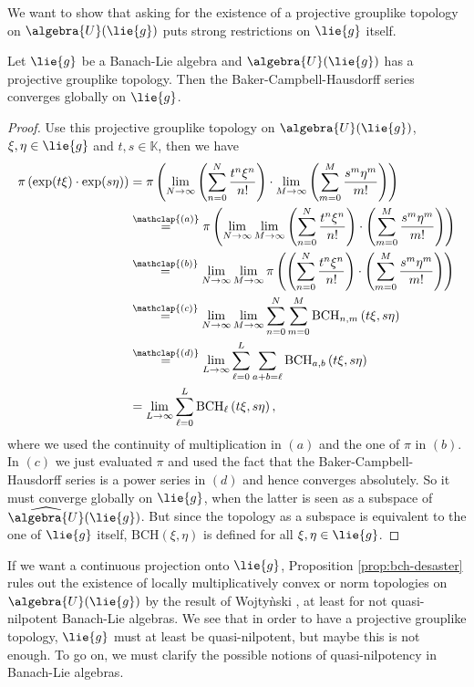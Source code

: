 \documentclass[
11pt,                          %
english                        %
]{article}
\newcommand{\bch}[2]{\mathrm{BCH}\left(#1, #2\right)}
\newcommand{\bchpart}[3]{\mathrm{BCH}_{#1}\left(#2, #3\right)}
\newcommand{\bchparts}[4]{\mathrm{BCH}_{#1, #2}\left(#3, #4\right)}
\newcommand\ot[2]{\stackrel{\mathclap{#1}}{#2}}
\begin{document}
We want to show that asking for the existence of a projective grouplike topology 
on $\algebra{U}(\lie{g})$ puts strong restrictions on $\lie{g}$ itself.
\begin{proposition}
	\label{prop:bch-desaster}
	Let $\lie{g}$ be a Banach-Lie algebra and $\algebra{U}(\lie{g})$ has a projective 
	grouplike topology. Then the Baker-Campbell-Hausdorff series converges globally 
	on $\lie{g}$.
\end{proposition}
\begin{proof}
	Use this projective grouplike topology on $\algebra{U}(\lie{g})$, $\xi, \eta \in 
	\lie{g}$ and $t,s \in \mathbb{K}$, then we have
	\begin{align*}
		\pi \left( \exp(t \xi) \cdot \exp(s \eta) \right)
		& =
		\pi
		\left(
			\lim_{N \rightarrow \infty}
			\left(
				\sum\limits_{n=0}^N
				\frac{t^n \xi^n}{n!}
			\right)
			\cdot
			\lim_{M \rightarrow \infty}
			\left(
				\sum\limits_{m=0}^M
				\frac{s^m \eta^m}{m!}
			\right)
		\right)
		\\
		& \ot{(a)}{=}
		\pi
		\left(
			\lim_{N \rightarrow \infty}
			\lim_{M \rightarrow \infty}
			\left(
				\sum\limits_{n=0}^N
				\frac{t^n \xi^n}{n!}
			\right)
			\cdot
			\left(
				\sum\limits_{m=0}^M
				\frac{s^m \eta^m}{m!}
			\right)
		\right)
		\\
		& \ot{(b)}{=}
		\lim_{N \rightarrow \infty}
		\lim_{M \rightarrow \infty}
		\pi
		\left(	
			\left(
				\sum\limits_{n=0}^N
				\frac{t^n \xi^n}{n!}
			\right)
			\cdot
			\left(
				\sum\limits_{m=0}^M
				\frac{s^m \eta^m}{m!}
			\right)
		\right)
		\\
		& \ot{(c)}{=}
		\lim_{N \rightarrow \infty}
		\lim_{M \rightarrow \infty}
		\sum\limits_{n=0}^{N}
		\sum\limits_{m=0}^{M}
		\bchparts{n}{m}{t \xi}{s \eta}
		\\
		& \ot{(d)}{=}
		\lim_{L \rightarrow \infty}
		\sum\limits_{\ell=0}^{L}
		\sum\limits_{a + b = \ell}
		\bchparts{a}{b}{t \xi}{s \eta}
		\\
		& =
		\lim_{L \rightarrow \infty}
		\sum\limits_{\ell=0}^{L}
		\bchpart{\ell}{t \xi}{s \eta},
	\end{align*}
	where we used the continuity of multiplication in $(a)$ and the one of $\pi$ in 
	$(b)$. In $(c)$ we just evaluated $\pi$ and used the fact that the 
	Baker-Campbell-Hausdorff series is a power series in $(d)$ and hence converges 
	absolutely. So it must converge globally on $\lie{g}$, when the latter is seen 
	as a subspace of $\widehat{\algebra{U}}(\lie{g})$. But since the topology as a 
	subspace is equivalent to the one of $\lie{g}$ itself, $\bch{\xi}{\eta}$ is 
	defined for all $\xi, \eta \in \lie{g}$.
\end{proof}
If we want a continuous projection onto $\lie{g}$, Proposition 
\ref{prop:bch-desaster} rules out the existence of locally multiplicatively convex or 
norm topologies on $\algebra{U}(\lie{g})$ by the result of Wojty{\`n}ski 
\cite{wojtynski:1998a}, at least for not quasi-nilpotent Banach-Lie algebras. We see 
that in order to have a projective grouplike topology, $\lie{g}$ must at least be 
quasi-nilpotent, but maybe this is not enough. To go on, we must clarify the possible 
notions of quasi-nilpotency in Banach-Lie algebras. 
\end{document}
